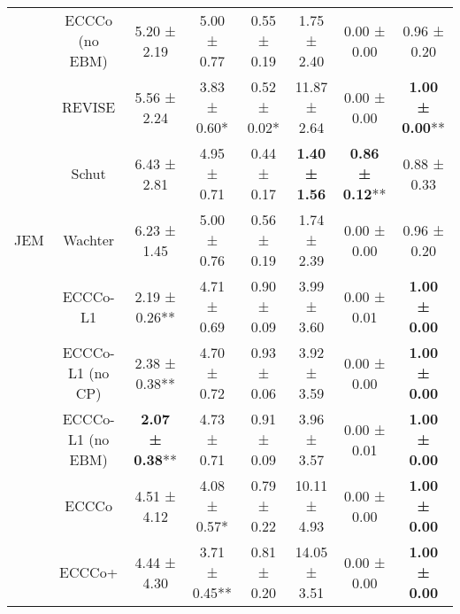 \begin{table}
{\begin{tabular}[t]{cccccccc}
 & ECCCo (no EBM) & 5.20 ± 2.19\hphantom{*}\hphantom{*} & 5.00 ± 0.77\hphantom{*}\hphantom{*} & 0.55 ± 0.19\hphantom{*}\hphantom{*} & 1.75 ± 2.40\hphantom{*}\hphantom{*} & 0.00 ± 0.00\hphantom{*}\hphantom{*} & 0.96 ± 0.20\hphantom{*}\hphantom{*}\\

 & REVISE & 5.56 ± 2.24\hphantom{*}\hphantom{*} & 3.83 ± 0.60*\hphantom{*} & 0.52 ± 0.02*\hphantom{*} & 11.87 ± 2.64\hphantom{*}\hphantom{*} & 0.00 ± 0.00\hphantom{*}\hphantom{*} & \textbf{1.00 ± 0.00}**\\

 & Schut & 6.43 ± 2.81\hphantom{*}\hphantom{*} & 4.95 ± 0.71\hphantom{*}\hphantom{*} & 0.44 ± 0.17\hphantom{*}\hphantom{*} & \textbf{1.40 ± 1.56}\hphantom{*}\hphantom{*} & \textbf{0.86 ± 0.12}** & 0.88 ± 0.33\hphantom{*}\hphantom{*}\\

\multirow[t]{-10}{*}{\centering\arraybackslash JEM} & Wachter & 6.23 ± 1.45\hphantom{*}\hphantom{*} & 5.00 ± 0.76\hphantom{*}\hphantom{*} & 0.56 ± 0.19\hphantom{*}\hphantom{*} & 1.74 ± 2.39\hphantom{*}\hphantom{*} & 0.00 ± 0.00\hphantom{*}\hphantom{*} & 0.96 ± 0.20\hphantom{*}\hphantom{*}\\
\cmidrule{1-8}
 & ECCCo-L1 & 2.19 ± 0.26** & 4.71 ± 0.69\hphantom{*}\hphantom{*} & 0.90 ± 0.09\hphantom{*}\hphantom{*} & 3.99 ± 3.60\hphantom{*}\hphantom{*} & 0.00 ± 0.01\hphantom{*}\hphantom{*} & \textbf{1.00 ± 0.00}\hphantom{*}\hphantom{*}\\

 & ECCCo-L1 (no CP) & 2.38 ± 0.38** & 4.70 ± 0.72\hphantom{*}\hphantom{*} & 0.93 ± 0.06\hphantom{*}\hphantom{*} & 3.92 ± 3.59\hphantom{*}\hphantom{*} & 0.00 ± 0.00\hphantom{*}\hphantom{*} & \textbf{1.00 ± 0.00}\hphantom{*}\hphantom{*}\\

 & ECCCo-L1 (no EBM) & \textbf{2.07 ± 0.38}** & 4.73 ± 0.71\hphantom{*}\hphantom{*} & 0.91 ± 0.09\hphantom{*}\hphantom{*} & 3.96 ± 3.57\hphantom{*}\hphantom{*} & 0.00 ± 0.01\hphantom{*}\hphantom{*} & \textbf{1.00 ± 0.00}\hphantom{*}\hphantom{*}\\

 & ECCCo & 4.51 ± 4.12\hphantom{*}\hphantom{*} & 4.08 ± 0.57*\hphantom{*} & 0.79 ± 0.22\hphantom{*}\hphantom{*} & 10.11 ± 4.93\hphantom{*}\hphantom{*} & 0.00 ± 0.00\hphantom{*}\hphantom{*} & \textbf{1.00 ± 0.00}\hphantom{*}\hphantom{*}\\

 & ECCCo+ & 4.44 ± 4.30\hphantom{*}\hphantom{*} & 3.71 ± 0.45** & 0.81 ± 0.20\hphantom{*}\hphantom{*} & 14.05 ± 3.51\hphantom{*}\hphantom{*} & 0.00 ± 0.00\hphantom{*}\hphantom{*} & \textbf{1.00 ± 0.00}\hphantom{*}\hphantom{*}\\


\end{tabular}}
\end{table}
